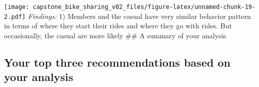 \documentclass[
]{article}
\begin{document}
\texttt{[image: capstone\_bike\_sharing\_v02\_files/figure-latex/unnamed-chunk-19-2.pdf]}
\emph{Findings:} 1) Members and the casual have very similar behavior
pattern in terms of where they start their rides and where they go with
rides. But occasionally, the casual are more likely \#\# A summary of
your analysis

\hypertarget{your-top-three-recommendations-based-on-your-analysis}{%
\subsection{Your top three recommendations based on your
analysis}\label{your-top-three-recommendations-based-on-your-analysis}}
\end{document}
